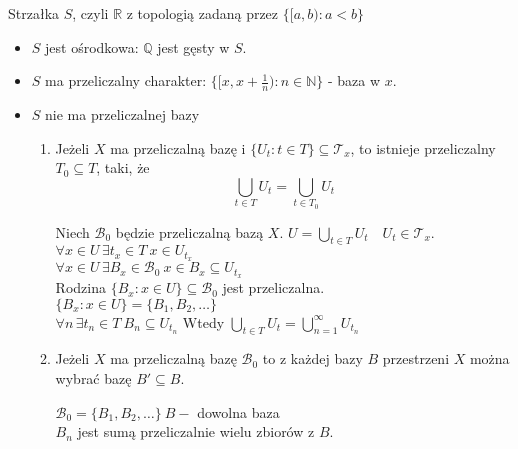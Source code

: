 \begin{prz} 
    Strzałka $S$, czyli $\mathbb R$ z topologią zadaną przez $\{ [a,b): a < b \}$ 
    \begin{itemize} 
        \item $S$ jest ośrodkowa: $\mathbb Q$ jest gęsty w $S$. 
        \item $S$ ma przeliczalny charakter: $\{ [x,x+\frac{1}{n}): n \in \mathbb N \}$ - baza w $x$.
        \item $S$ nie ma przeliczalnej bazy
            \begin{lem}  \hfill
                \begin{enumerate}[(1)] 
                    \item Jeżeli $X$ ma przeliczalną bazę i $\{U_t : t \in T\} \subseteq \mathcal T_x$, to 
                        istnieje przeliczalny $T_0 \subseteq T$, taki, że 
                        \[ \bigcup_{t \in T} U_t = \bigcup_{t \in T_0} U_t\]
                        \begin{dd} 
                            Niech $\mathcal B_0$ będzie przeliczalną bazą $X$. $U = \bigcup\limits_{t \in T} U_t
                            \quad U_t \in \mathcal T_x$. \\ 
                            $\forall x \in U \, \exists t_x \in T \ x \in U_{t_x}$ \\ 
                            $\forall x \in U \, \exists B_x \in \mathcal B_0 \ x \in B_x \subseteq U_{t_x}$ \\ 
                            Rodzina $\{B_x: x \in U \} \subseteq \mathcal B_0$ jest przeliczalna. \\ 
                            $\{B_x: x \in U\} = \{B_1,B_2,\ldots\}$ \\ 
                            $\forall n \, \exists t_n \in T \ B_n \subseteq U_{t_n}$
                            Wtedy $\bigcup\limits_{t \in T} U_t = \bigcup\limits_{n=1}^\infty U_{t_n}$
                        \end{dd} 
                    \item Jeżeli $X$ ma przeliczalną bazę $\mathcal B_0$ to z każdej bazy $B$ przestrzeni $X$
                        można wybrać bazę $B' \subseteq B$. 
                        \begin{dd} 
                            $\mathcal B_0 = \{ B_1,B_2,\ldots\} \ B - $ dowolna baza \\ 
                            $B_n$ jest sumą przeliczalnie wielu zbiorów z $B$. \\ 

\end{dd}
\end{enumerate}
\end{lem}
\end{itemize}
\end{prz}
